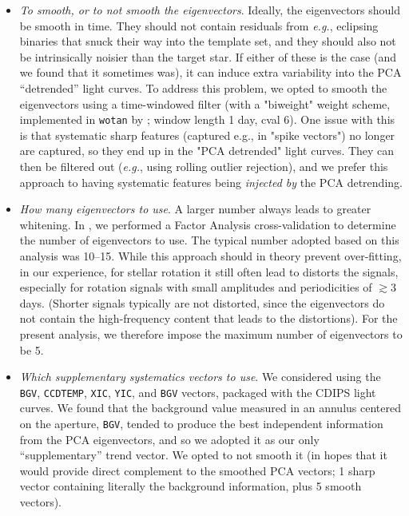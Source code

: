\documentclass[12pt,twocolumn,tighten]{aastex63}
\begin{document}
\begin{itemize}

  \item {\it To smooth, or to not smooth the eigenvectors}.
  Ideally, the eigenvectors should be smooth in time. They should not contain
    residuals from {\it e.g.}, eclipsing binaries that snuck their way
    into the template set, and they should also not be intrinsically noisier
    than the target star. If either of these is the case (and we found that
    it sometimes was), it can
    induce extra variability into the PCA ``detrended'' light curves.
    To address this problem, we opted to smooth the eigenvectors using
    a time-windowed filter (with a "biweight" weight scheme, implemented in
    \texttt{wotan} by \citet{hippke_wotan_2019}; window length 1 day, cval 6).
  One issue with this is that systematic sharp features (captured e.g., in
  "spike vectors") no longer are captured, so they end up in the "PCA
  detrended" light curves. They can then be filtered out
  ({\it e.g.}, using rolling outlier rejection), and we prefer this approach to having
  systematic features being {\it injected by} the PCA detrending.

  \item {\it How many eigenvectors to use}.
    A larger number always leads to greater whitening.  In
    \citet{bouma_cdipsI_2019}, we performed a Factor Analysis
    cross-validation to determine the number of eigenvectors to use.
    The typical number adopted based on this analysis was 10--15.
    While this approach should in theory prevent over-fitting, in
    our experience, for stellar rotation it still often lead to
    distorts the signals, especially for rotation signals with small amplitudes
    and periodicities of
    $\gtrsim 3$ days.  (Shorter signals typically are not distorted,
    since the eigenvectors do not contain the high-frequency
    content that leads to the distortions).  For the present analysis, we
    therefore impose the maximum number of eigenvectors to be 5.

  \item {\it Which supplementary systematics vectors to use}.
    We considered using the \texttt{BGV}, \texttt{CCDTEMP},
    \texttt{XIC}, \texttt{YIC}, and \texttt{BGV} vectors, packaged
    with the CDIPS light curves. We found that the background value
    measured in an annulus centered on the aperture, \texttt{BGV},
    tended to produce the best independent information from the PCA
    eigenvectors, and so we adopted it as our only ``supplementary''
    trend vector.  We opted to not smooth it (in hopes that it would
    provide direct complement to the smoothed PCA vectors; 1 sharp
    vector containing literally the background information, plus 5
    smooth vectors).
\end{itemize}
\end{document}
